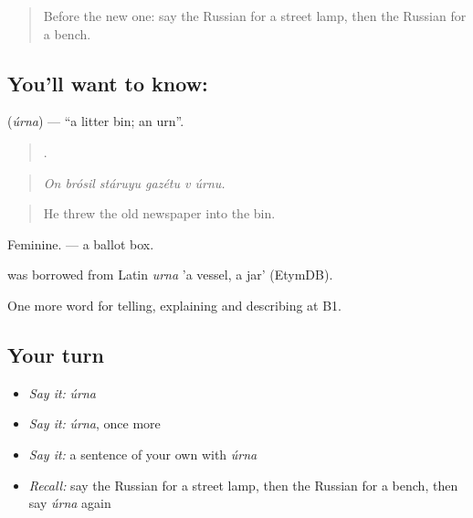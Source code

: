 \label{lesson:RU-C445-urna}



\begin{quote}
Before the new one: say the Russian for a street lamp, then the Russian for a bench.
\end{quote}

\subsection*{You'll want to know: }
\textbf{} (\emph{úrna}) — \textquotedblleft{}a litter bin; an urn\textquotedblright{}.

\begin{quote}
     .
\end{quote}

\begin{quote}
\emph{On brósil stáruyu gazétu v úrnu.}
\end{quote}

\begin{quote}
He threw the old newspaper into the bin.
\end{quote}

Feminine. \emph{  } — a ballot box.

\begin{cousinweb}
\emph{} was borrowed from Latin \emph{urna} 'a vessel, a jar' (EtymDB).
\end{cousinweb}

\begin{grammarlens}[title={What you've built}]
One more word for telling, explaining and describing at B1.
\end{grammarlens}

\subsection*{Your turn}
\begin{itemize}
\raggedright
  \item \emph{Say it:} \emph{úrna}
  \item \emph{Say it:} \emph{úrna}, once more
  \item \emph{Say it:} a sentence of your own with \emph{úrna}
  \item \emph{Recall:} say the Russian for a street lamp, then the Russian for a bench, then say \emph{úrna} again
\end{itemize}

